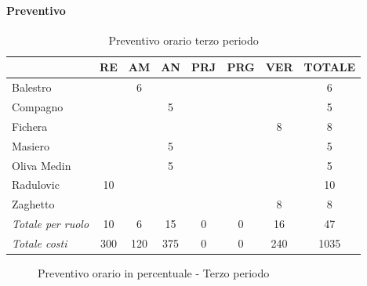 \documentclass[a4paper,12pt]{article}
\begin{document}
            \paragraph{Preventivo}
                \begin{table}[H]
                \centering
                \caption{Preventivo orario terzo periodo}
                \begin{tabular}{|l|c|c|c|c|c|c|c|}
                \hline
                    \rowcolor{lightgray}{\textbf{Membro}} & {\textbf{RE}} & {\textbf{AM}} & {\textbf{AN}} & {\textbf{PRJ}} & {\textbf{PRG}} & {\textbf{VER}} & {\textbf{TOTALE}}\\
                \hline
                    Balestro & & 6 & & & & & 6\\
                \hline
                    Compagno & & & 5 & & & & 5\\
                \hline
                    Fichera & & & & & & 8 & 8\\
                \hline
                    Masiero & & & 5 & & & & 5\\
                \hline
                    Oliva Medin & & & 5 & & & & 5\\
                \hline
                    Radulovic & 10 & & & & & & 10\\
                \hline
                    Zaghetto & & & & & & 8 & 8\\
                \hline
                    \rowcolor{lightgray}\textit{Totale per ruolo} & 10 & 6 & 15 & 0 & 0 & 16 & 47\\
                \hline
                    \rowcolor{lightgray}\textit{Totale costi} & 300 & 120 & 375 & 0 & 0 & 240 & 1035\\
                \hline
                \end{tabular}
                \end{table}

                \begin{figure}[H]
                \centering
                \caption{Preventivo orario in percentuale - Terzo periodo}
                \end{figure}
                
\end{document}
